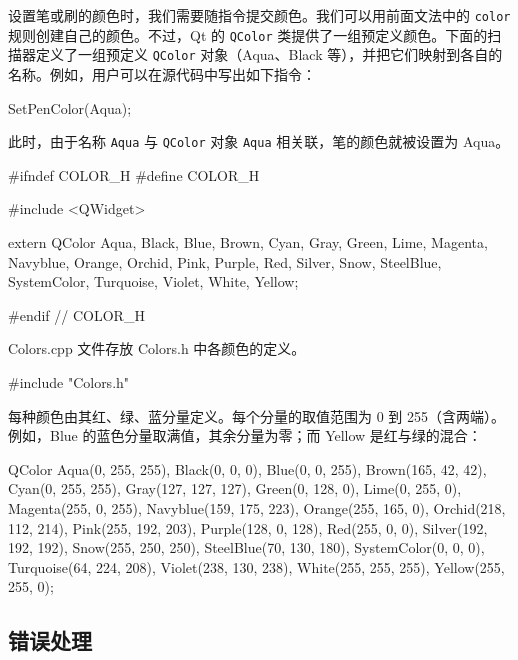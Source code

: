 设置笔或刷的颜色时，我们需要随指令提交颜色。我们可以用前面文法中的 \texttt{color} 规则创建自己的颜色。不过，Qt 的 \texttt{QColor} 类提供了一组预定义颜色。下面的扫描器定义了一组预定义 \texttt{QColor} 对象（Aqua、Black 等），并把它们映射到各自的名称。例如，用户可以在源代码中写出如下指令：

\begin{codebox}
SetPenColor(Aqua);
\end{codebox}

此时，由于名称 \texttt{Aqua} 与 \texttt{QColor} 对象 \texttt{Aqua} 相关联，笔的颜色就被设置为 Aqua。

\medskip{}

\begin{codebox}
#ifndef COLOR_H
#define COLOR_H

#include <QWidget>

extern QColor
  Aqua, Black, Blue, Brown, Cyan, Gray, Green, Lime, Magenta,
  Navyblue, Orange, Orchid, Pink, Purple, Red, Silver, Snow,
  SteelBlue, SystemColor, Turquoise, Violet, White, Yellow;

#endif // COLOR_H
\end{codebox}

Colors.cpp 文件存放 Colors.h 中各颜色的定义。

\medskip{}

\begin{codebox}
#include "Colors.h"
\end{codebox}

每种颜色由其红、绿、蓝分量定义。每个分量的取值范围为 0 到 255（含两端）。例如，Blue 的蓝色分量取满值，其余分量为零；而 Yellow 是红与绿的混合：

\begin{codebox}
QColor
  Aqua(0, 255, 255), Black(0, 0, 0), Blue(0, 0, 255),
  Brown(165, 42, 42), Cyan(0, 255, 255), Gray(127, 127, 127),
  Green(0, 128, 0), Lime(0, 255, 0), Magenta(255, 0, 255),
  Navyblue(159, 175, 223), Orange(255, 165, 0),
  Orchid(218, 112, 214), Pink(255, 192, 203),
  Purple(128, 0, 128), Red(255, 0, 0), Silver(192, 192, 192),
  Snow(255, 250, 250), SteelBlue(70, 130, 180),
  SystemColor(0, 0, 0), Turquoise(64, 224, 208),
  Violet(238, 130, 238), White(255, 255, 255),
  Yellow(255, 255, 0);
\end{codebox}

\subsection{错误处理}

